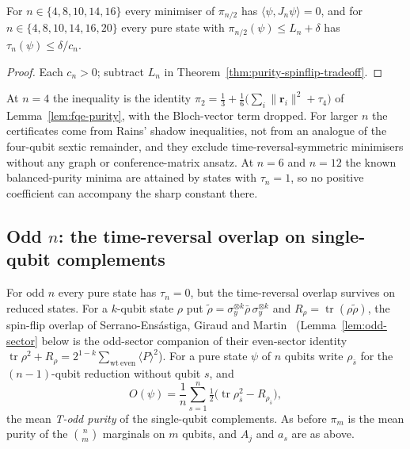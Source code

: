 \begin{corollary}
\label{cor:spinflip-rigidity}
For $n\in\{4,8,10,14,16\}$ every minimiser of $\pi_{n/2}$ has $\langle\psi,J_n\psi\rangle=0$, and for
$n\in\{4,8,10,14,16,20\}$ every pure state with $\pi_{n/2}(\psi)\le L_n+\delta$ has
$\tau_n(\psi)\le\delta/c_n$.
\end{corollary}
\begin{proof}
Each $c_n>0$; subtract $L_n$ in Theorem~\ref{thm:purity-spinflip-tradeoff}.
\end{proof}

\begin{remark}
At $n=4$ the inequality is the identity $\pi_2=\tfrac13+\tfrac16\bigl(\sum_i\|\mathbf r_i\|^2+\tau_4\bigr)$
of Lemma~\ref{lem:fqe-purity}, with the Bloch-vector term dropped. For larger $n$ the certificates
come from Rains' shadow inequalities, not from an analogue of the four-qubit sextic remainder, and they
exclude time-reversal-symmetric minimisers without any graph or conference-matrix ansatz. At $n=6$
and $n=12$ the known balanced-purity minima are attained by states with $\tau_n=1$, so no positive
coefficient can accompany the sharp constant there.
\end{remark}

\subsection{Odd $n$: the time-reversal overlap on single-qubit complements}\label{sec:odd-spinflip}

For odd $n$ every pure state has $\tau_n=0$, but the time-reversal overlap survives on reduced states.
For a $k$-qubit state $\rho$ put $\tilde\rho=\sigma_y^{\otimes k}\bar\rho\,\sigma_y^{\otimes k}$ and $R_\rho=\operatorname{tr}(\rho\tilde\rho)$, the spin-flip overlap of
Serrano-Ens\'astiga, Giraud and Martin~\cite{SGM} (Lemma~\ref{lem:odd-sector} below is the odd-sector companion of their even-sector identity $\operatorname{tr}\rho^2+R_\rho=2^{1-k}\sum_{\mathrm{wt\ even}}\langle P\rangle^2$).
For a pure state $\psi$ of $n$ qubits write $\rho_{\bar s}$ for the $(n-1)$-qubit reduction without qubit $s$, and
\[
 O(\psi)=\frac1n\sum_{s=1}^n\tfrac12\bigl(\operatorname{tr}\rho_{\bar s}^2-R_{\rho_{\bar s}}\bigr),
\]
the mean \emph{T-odd purity} of the single-qubit complements. As before $\pi_m$ is the mean purity of the $\binom nm$ marginals on
$m$ qubits, and $A_j$ and $a_s$ are as above.

